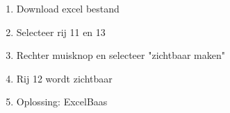 \begin{enumerate}
  \item Download excel bestand
  \item Selecteer rij 11 en 13
  \item Rechter muisknop en selecteer "zichtbaar maken"
  \item Rij 12 wordt zichtbaar
  \item Oplossing: ExcelBaas
\end{enumerate}
